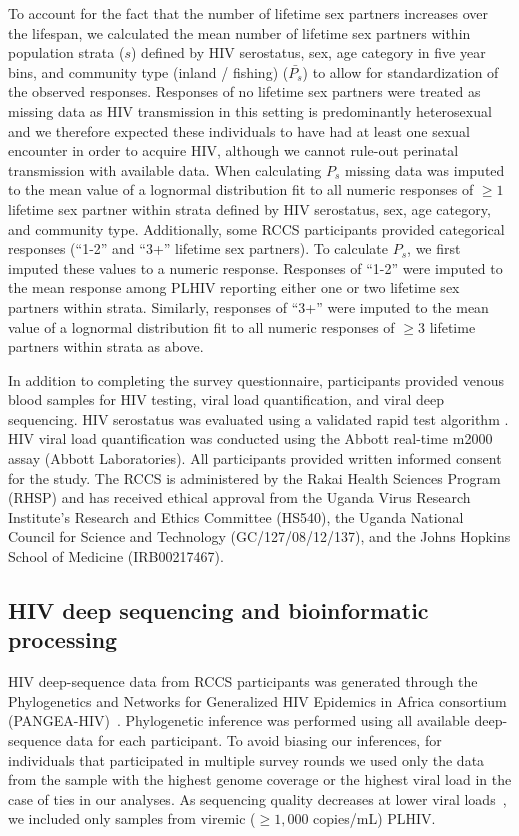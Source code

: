 \documentclass[10pt,letterpaper]{article}
\begin{document}
To account for the fact that the number of lifetime sex partners increases over the lifespan, we calculated the mean number of lifetime sex partners within population strata ($s$) defined by HIV serostatus, sex, age category in five year bins, and community type (inland / fishing) ($\bar{P_s}$) to allow for standardization of the observed responses. Responses of no lifetime sex partners were treated as missing data as HIV transmission in this setting is predominantly heterosexual \cite{ugandaAIDS2012} and we therefore expected these individuals to have had at least one sexual encounter in order to acquire HIV, although we cannot rule-out perinatal transmission with available data. When calculating $P_s$ missing data was imputed to the mean value of a lognormal distribution fit to all numeric responses of $\ge1$ lifetime sex partner within strata defined by HIV serostatus, sex, age category, and community type. Additionally, some RCCS participants provided categorical responses (``1-2'' and ``3+'' lifetime sex partners). To calculate $P_s$, we first imputed these values to a numeric response. Responses of ``1-2'' were imputed to the mean response among PLHIV reporting either one or two lifetime sex partners within strata. Similarly, responses of ``3+'' were imputed to the mean value of a lognormal distribution fit to all numeric responses of $\ge3$ lifetime partners within strata as above. 

In addition to completing the survey questionnaire, participants provided venous blood samples for HIV testing, viral load quantification, and viral deep sequencing. HIV serostatus was evaluated using a validated rapid test algorithm \cite{kagulire2011}. HIV viral load quantification was conducted using the Abbott real-time m2000 assay (Abbott Laboratories). All participants provided written informed consent for the study. The RCCS is administered by the Rakai Health Sciences Program (RHSP) and has received ethical approval from the Uganda Virus Research Institute’s Research and Ethics Committee (HS540), the Uganda National Council for Science and Technology (GC/127/08/12/137), and the Johns Hopkins School of Medicine (IRB00217467).  

\subsection{HIV deep sequencing and bioinformatic processing}
HIV deep-sequence data from RCCS participants was generated through the Phylogenetics and Networks for Generalized HIV Epidemics in Africa consortium (PANGEA-HIV)~\cite{pillay2015,abeler-dorner2019}. Phylogenetic inference was performed using all available deep-sequence data for each participant. To avoid biasing our inferences, for individuals that participated in multiple survey rounds we used only the data from the sample with the highest genome coverage or the highest viral load in the case of ties in our analyses. As sequencing quality decreases at lower viral loads~\cite{bonsall2020}, we included only samples from viremic ($\ge1,000$ copies/mL) PLHIV. \par
\end{document}
